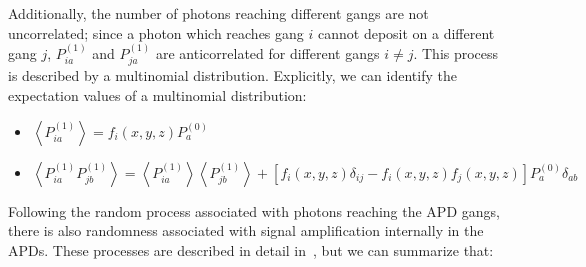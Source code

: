 Additionally, the number of photons reaching different gangs are not uncorrelated; since a photon which reaches gang $i$ cannot deposit on a different gang $j$, $P^{(1)}_{ia}$ and $P^{(1)}_{ja}$ are anticorrelated for different gangs $i \ne j$.  This process is described by a multinomial distribution.  Explicitly, we can identify the expectation values of a multinomial distribution:
\begin{itemize}
\item $\left< P^{(1)}_{ia} \right> = f_i(x,y,z)P^{(0)}_a$
\item $\left< P^{(1)}_{ia} P^{(1)}_{jb} \right> = \left< P^{(1)}_{ia} \right> \left< P^{(1)}_{jb} \right> + \left[ f_i(x,y,z)\delta_{ij} - f_i(x,y,z)f_j(x,y,z) \right] P^{(0)}_a \delta_{ab}$
\end{itemize}

Following the random process associated with photons reaching the APD gangs, there is also randomness associated with signal amplification internally in the APDs.  These processes are described in detail in~\cite{EXOLAAPD}, but we can summarize that:

